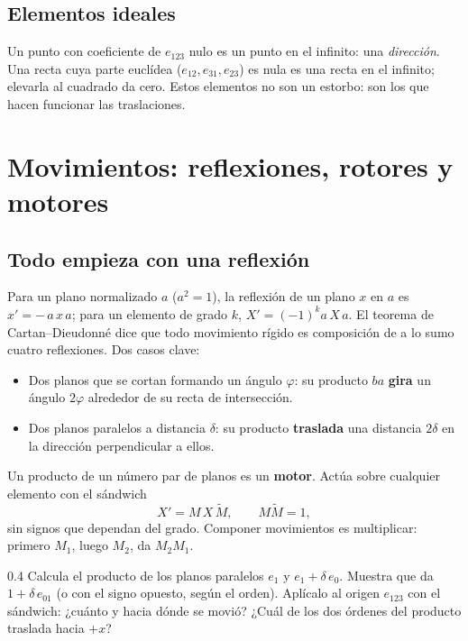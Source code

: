 \documentclass[11pt,a4paper]{article}
\numberwithin{equation}{section}
\newcommand{\rev}[1]{\widetilde{#1}}
\begin{document}
\subsection{Elementos ideales}
Un punto con coeficiente de $e_{123}$ nulo es un punto en el infinito: una \emph{dirección}. Una recta cuya parte
euclídea ($e_{12},e_{31},e_{23}$) es nula es una recta en el infinito; elevarla al cuadrado da cero. Estos elementos
no son un estorbo: son los que hacen funcionar las traslaciones.

\section{Movimientos: reflexiones, rotores y motores}

\subsection{Todo empieza con una reflexión}
Para un plano normalizado $a$ ($a^2 = 1$), la reflexión de un plano $x$ en $a$ es $x' = -\,a\,x\,a$; para un elemento
de grado $k$, $X' = (-1)^k a\,X\,a$. El teorema de Cartan–Dieudonné dice que todo movimiento rígido es composición de a
lo sumo cuatro reflexiones. Dos casos clave:
\begin{itemize}[leftmargin=*]
  \item Dos planos que se cortan formando un ángulo $\varphi$: su producto $ba$ \textbf{gira} un ángulo $2\varphi$
        alrededor de su recta de intersección.
  \item Dos planos paralelos a distancia $\delta$: su producto \textbf{traslada} una distancia $2\delta$ en la
        dirección perpendicular a ellos.
\end{itemize}
Un producto de un número par de planos es un \textbf{motor}. Actúa sobre cualquier elemento con el sándwich
\begin{equation}
  X' = M\,X\,\rev M,\qquad M\rev M = 1,
\end{equation}
sin signos que dependan del grado. Componer movimientos es multiplicar: primero $M_1$, luego $M_2$, da $M_2M_1$.

\begin{ejercicio}{0.4}
Calcula el producto de los planos paralelos $e_1$ y $e_1 + \delta\,e_0$. Muestra que da $1 + \delta\,e_{01}$ (o con
el signo opuesto, según el orden). Aplícalo al origen $e_{123}$ con el sándwich: ¿cuánto y hacia dónde se movió? ¿Cuál
de los dos órdenes del producto traslada hacia $+x$?
\end{ejercicio}
\end{document}
